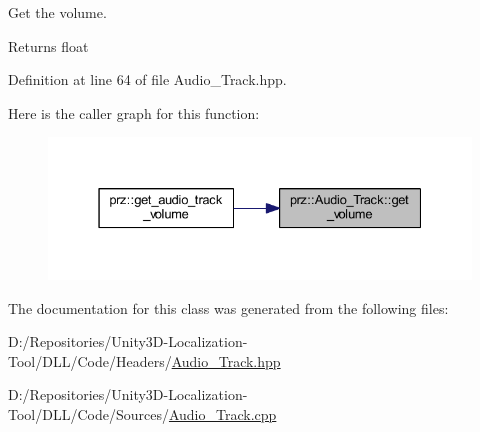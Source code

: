 Get the volume. 

\begin{DoxyReturn}{Returns}
float 
\end{DoxyReturn}


Definition at line 64 of file Audio\+\_\+\+Track.\+hpp.

Here is the caller graph for this function\+:
\nopagebreak
\begin{figure}[H]
\begin{center}
\leavevmode
\includegraphics[width=331pt]{classprz_1_1_audio___track_ad3a1f86e10f7e128a5589b621ff28b45_icgraph}
\end{center}
\end{figure}


The documentation for this class was generated from the following files\+:\begin{DoxyCompactItemize}
\item 
D\+:/\+Repositories/\+Unity3\+D-\/\+Localization-\/\+Tool/\+D\+L\+L/\+Code/\+Headers/\mbox{\hyperlink{_audio___track_8hpp}{Audio\+\_\+\+Track.\+hpp}}\item 
D\+:/\+Repositories/\+Unity3\+D-\/\+Localization-\/\+Tool/\+D\+L\+L/\+Code/\+Sources/\mbox{\hyperlink{_audio___track_8cpp}{Audio\+\_\+\+Track.\+cpp}}\end{DoxyCompactItemize}
